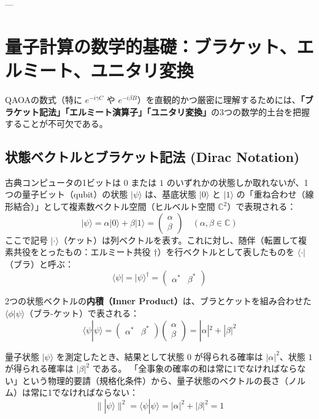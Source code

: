 \documentclass[11pt,a4paper]{ltjsarticle}
\theoremstyle{definition}
\theoremstyle{plain}
\theoremstyle{remark}
\newcommand{\ket}[1]{|#1\rangle}
\newcommand{\bra}[1]{\langle#1|}
\newcommand{\braket}[2]{\langle#1|#2\rangle}
\begin{document}
---

\section{量子計算の数学的基礎：ブラケット、エルミート、ユニタリ変換}

QAOAの数式（特に $e^{-i \gamma C}$ や $e^{-i \beta B}$）を直観的かつ厳密に理解するためには、\textbf{「ブラケット記法」「エルミート演算子」「ユニタリ変換」}の3つの数学的土台を把握することが不可欠である。

\subsection{状態ベクトルとブラケット記法 (Dirac Notation)}
古典コンピュータの1ビットは $0$ または $1$ のいずれかの状態しか取れないが、1つの量子ビット（qubit）の状態 $\ket{\psi}$ は、基底状態 $\ket{0}$ と $\ket{1}$ の「重ね合わせ（線形結合）」として複素数ベクトル空間（ヒルベルト空間 $\mathbb{C}^2$）で表現される：
\begin{equation}
\ket{\psi} = \alpha \ket{0} + \beta \ket{1} = \begin{pmatrix} \alpha \\ \beta \end{pmatrix} \quad (\alpha, \beta \in \mathbb{C})
\end{equation}
ここで記号 $\ket{\cdot}$（ケット）は列ベクトルを表す。これに対し、随伴（転置して複素共役をとったもの：エルミート共役 $\dagger$）を行ベクトルとして表したものを $\bra{\cdot}$（ブラ）と呼ぶ：
\begin{equation}
\bra{\psi} = \ket{\psi}^\dagger = \begin{pmatrix} \alpha^* & \beta^* \end{pmatrix}
\end{equation}

2つの状態ベクトルの\textbf{内積（Inner Product）}は、ブラとケットを組み合わせた $\braket{\phi}{\psi}$（ブラ-ケット）で表される：
\begin{equation}
\braket{\psi}{\psi} = \begin{pmatrix} \alpha^* & \beta^* \end{pmatrix} \begin{pmatrix} \alpha \\ \beta \end{pmatrix} = |\alpha|^2 + |\beta|^2
\end{equation}

\begin{conceptbox}
量子状態 $\ket{\psi}$ を測定したとき、結果として状態 $0$ が得られる確率は $|\alpha|^2$、状態 $1$ が得られる確率は $|\beta|^2$ である。
「全事象の確率の和は常に1でなければならない」という物理的要請（規格化条件）から、量子状態のベクトルの長さ（ノルム）は常に1でなければならない：
\begin{equation}
\|\ket{\psi}\|^2 = \braket{\psi}{\psi} = |\alpha|^2 + |\beta|^2 = 1
\end{equation}
\end{conceptbox}
\end{document}
